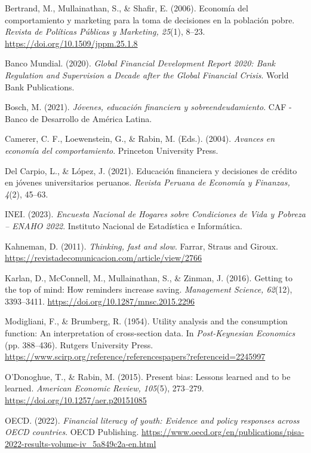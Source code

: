 \documentclass[10pt]{article}
\begin{document}
\begin{multicols}{2}
\begin{thebibliography}{99}
Bertrand, M., Mullainathan, S., \& Shafir, E. (2006). Economía del comportamiento y marketing para la toma de decisiones en la población pobre. \textit{Revista de Políticas Públicas y Marketing, 25}(1), 8–23. \url{https://doi.org/10.1509/jppm.25.1.8}

Banco Mundial. (2020). \textit{Global Financial Development Report 2020: Bank Regulation and Supervision a Decade after the Global Financial Crisis}. World Bank Publications.

Bosch, M. (2021). \textit{Jóvenes, educación financiera y sobreendeudamiento}. CAF - Banco de Desarrollo de América Latina.

Camerer, C. F., Loewenstein, G., \& Rabin, M. (Eds.). (2004). \textit{Avances en economía del comportamiento}. Princeton University Press.

Del Carpio, L., \& López, J. (2021). Educación financiera y decisiones de crédito en jóvenes universitarios peruanos. \textit{Revista Peruana de Economía y Finanzas, 4}(2), 45–63.

INEI. (2023). \textit{Encuesta Nacional de Hogares sobre Condiciones de Vida y Pobreza – ENAHO 2022}. Instituto Nacional de Estadística e Informática. 

Kahneman, D. (2011). \textit{Thinking, fast and slow}. Farrar, Straus and Giroux. \url{https://revistadecomunicacion.com/article/view/2766}

Karlan, D., McConnell, M., Mullainathan, S., \& Zinman, J. (2016). Getting to the top of mind: How reminders increase saving. \textit{Management Science, 62}(12), 3393–3411. \url{https://doi.org/10.1287/mnsc.2015.2296}


Modigliani, F., \& Brumberg, R. (1954). Utility analysis and the consumption function: An interpretation of cross-section data. In \textit{Post-Keynesian Economics} (pp. 388–436). Rutgers University Press. \url{https://www.scirp.org/reference/referencespapers?referenceid=2245997}

O’Donoghue, T., \& Rabin, M. (2015). Present bias: Lessons learned and to be learned. \textit{American Economic Review, 105}(5), 273–279. \url{https://doi.org/10.1257/aer.p20151085}


OECD. (2022). \textit{Financial literacy of youth: Evidence and policy responses across OECD countries}. OECD Publishing. \url{https://www.oecd.org/en/publications/pisa-2022-results-volume-iv_5a849c2a-en.html}


\end{thebibliography}
\end{multicols}
\end{document}
